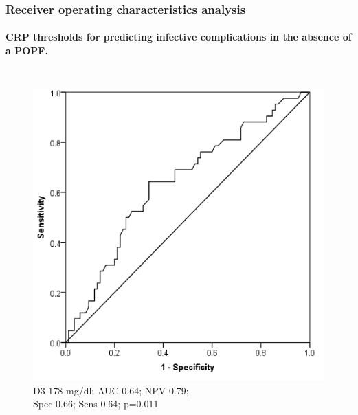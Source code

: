 \documentclass[10pt]{beamer}
\begin{document}
\begin{frame}
	\frametitle{Receiver operating characteristics analysis}
	\framesubtitle{CRP thresholds for predicting infective complications in the absence of a POPF. }
	\begin{columns}
			\begin{figure}
				\includegraphics[width=\textwidth]{../Figures/crp_comp_ROC_infection_D3}
				\\{\scriptsize D3 178 mg/dl; AUC 0.64; NPV 0.79; \\Spec 0.66; Sens 0.64; p=0.011}
			\end{figure}
		

\end{columns}
\end{frame}
\end{document}
